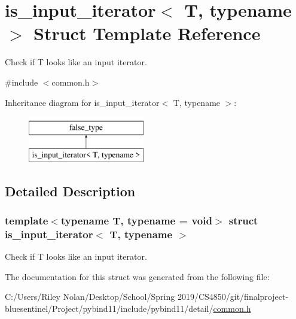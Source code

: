 \hypertarget{structis__input__iterator}{}\section{is\+\_\+input\+\_\+iterator$<$ T, typename $>$ Struct Template Reference}
\label{structis__input__iterator}


Check if T looks like an input iterator.  




{\ttfamily \#include $<$common.\+h$>$}

Inheritance diagram for is\+\_\+input\+\_\+iterator$<$ T, typename $>$\+:\begin{figure}[H]
\begin{center}
\leavevmode
\includegraphics[height=2.000000cm]{structis__input__iterator}
\end{center}
\end{figure}


\subsection{Detailed Description}
\subsubsection*{template$<$typename T, typename = void$>$\newline
struct is\+\_\+input\+\_\+iterator$<$ T, typename $>$}

Check if T looks like an input iterator. 

The documentation for this struct was generated from the following file\+:\begin{DoxyCompactItemize}
\item 
C\+:/\+Users/\+Riley Nolan/\+Desktop/\+School/\+Spring 2019/\+C\+S4850/git/finalproject-\/bluesentinel/\+Project/pybind11/include/pybind11/detail/\mbox{\hyperlink{detail_2common_8h}{common.\+h}}\end{DoxyCompactItemize}
